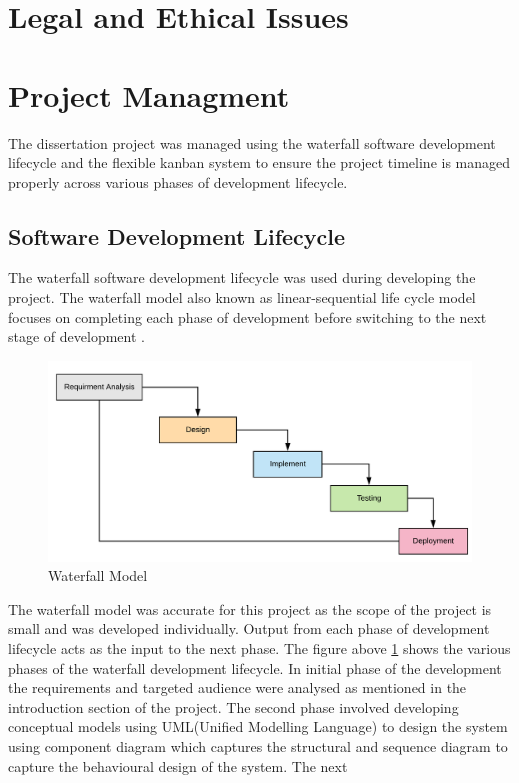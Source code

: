 \section{Legal and Ethical Issues}

\pagebreak

\section{Project Managment}
The dissertation project was managed using the waterfall software development lifecycle 
and the flexible kanban system to ensure the project timeline is managed properly across 
various phases of development lifecycle. 
\subsection{Software Development Lifecycle}
The waterfall software development lifecycle was used during developing the project. The waterfall
model also known as linear-sequential life cycle model focuses on completing each phase of
development before switching to the next stage of development \citep{sdlc}. 
\begin{figure}[!htp]
    \centering
    \includegraphics[width=.8\textwidth]{Images/waterfall}
    \caption{Waterfall Model}
    \label{fig:waterfall}
\end{figure}
The waterfall model was accurate for this project as the scope of the project is small and was developed individually. Output
from each phase of development lifecycle acts as the input to the next phase. The figure above
\ref{fig:waterfall} shows the various phases of the waterfall development lifecycle. In initial phase of the
development the requirements and targeted audience were analysed as mentioned in the
introduction section of the project. The second phase involved developing conceptual models using
UML(Unified Modelling Language) to design the system using component diagram which captures
the structural and sequence diagram to capture the behavioural design of the system. The next

